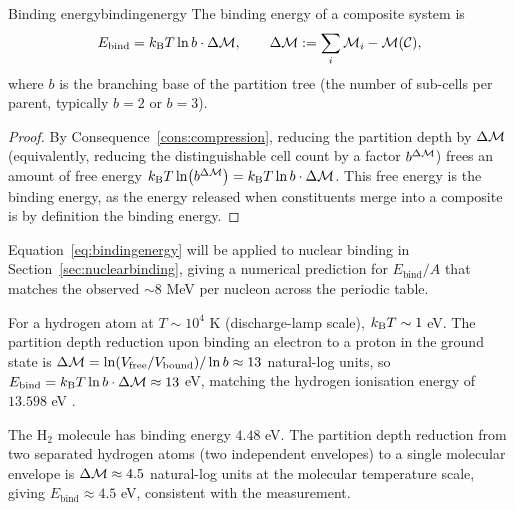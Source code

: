 \begin{consequence}{Binding energy}{bindingenergy}
The binding energy of a composite system is
\begin{equation}
E_{\mathrm{bind}}=k_{\mathrm{B}} T\ln b\cdot\Delta\mathcal{M},\qquad \Delta\mathcal{M}:=\sum_{i}\mathcal{M}_{i}-\mathcal{M}(\mathcal{C}),
\label{eq:bindingenergy}
\end{equation}
where $b$ is the branching base of the partition tree (the number of sub-cells per parent, typically $b=2$ or $b=3$).
\end{consequence}

\begin{proof}
By Consequence~\ref{cons:compression}, reducing the partition depth by $\Delta\mathcal{M}$ (equivalently, reducing the distinguishable cell count by a factor $b^{\Delta\mathcal{M}}$) frees an amount of free energy $k_{\mathrm{B}} T\ln(b^{\Delta\mathcal{M}})=k_{\mathrm{B}} T\ln b\cdot\Delta\mathcal{M}$. This free energy is the binding energy, as the energy released when constituents merge into a composite is by definition the binding energy.
\end{proof}

\begin{remark}
Equation~\eqref{eq:bindingenergy} will be applied to nuclear binding in Section~\ref{sec:nuclearbinding}, giving a numerical prediction for $E_{\mathrm{bind}}/A$ that matches the observed $\sim 8$ MeV per nucleon across the periodic table.
\end{remark}

\begin{example}
For a hydrogen atom at $T\sim 10^{4}$ K (discharge-lamp scale), $k_{\mathrm{B}} T\sim 1$ eV. The partition depth reduction upon binding an electron to a proton in the ground state is $\Delta\mathcal{M}=\ln(V_{\text{free}}/V_{\text{bound}})/\ln b\approx 13$ natural-log units, so $E_{\text{bind}}=k_{\mathrm{B}} T\ln b\cdot\Delta\mathcal{M}\approx 13$ eV, matching the hydrogen ionisation energy of $13.598$ eV \citep{nistasd}.
\end{example}

\begin{example}
The H$_{2}$ molecule has binding energy $4.48$ eV. The partition depth reduction from two separated hydrogen atoms (two independent envelopes) to a single molecular envelope is $\Delta\mathcal{M}\approx 4.5$ natural-log units at the molecular temperature scale, giving $E_{\text{bind}}\approx 4.5$ eV, consistent with the measurement.
\end{example}

